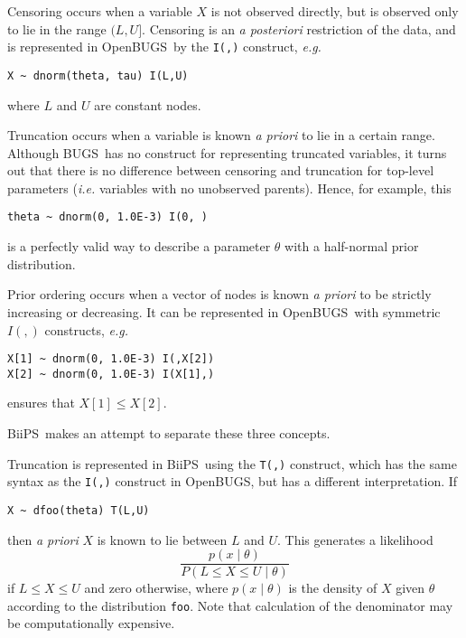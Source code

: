 \documentclass[11pt, a4paper, titlepage]{report}
\newcommand{\biips}{\textsf{BiiPS}}
\newcommand{\BUGS}{\textsf{BUGS}}
\newcommand{\OpenBUGS}{\textsf{OpenBUGS}}
\begin{document}
Censoring occurs when a variable $X$ is not observed directly,
but is observed only to lie in the range $(L,U]$.  Censoring is
an {\em a posteriori} restriction of the data, and is represented
in \OpenBUGS\ by the \texttt{I(,)} construct, {\em e.g.}
\begin{verbatim}
X ~ dnorm(theta, tau) I(L,U)
\end{verbatim}
where $L$ and $U$ are constant nodes.

Truncation occurs when a variable is known {\em a priori} to lie in
a certain range.  Although \BUGS\ has no construct for representing
truncated variables, it turns out that there is no difference between
censoring and truncation for top-level parameters ({\em i.e.} variables
with no unobserved parents).  Hence, for example, this
\begin{verbatim}
theta ~ dnorm(0, 1.0E-3) I(0, )
\end{verbatim}
is a perfectly valid way to describe a parameter $\theta$ with a
half-normal prior distribution.

Prior ordering occurs when a vector of nodes is known {\em a priori}
to be strictly increasing or decreasing. It can be represented in
\OpenBUGS\ with symmetric $I(,)$ constructs,  {\em e.g.}
\begin{verbatim}
X[1] ~ dnorm(0, 1.0E-3) I(,X[2])
X[2] ~ dnorm(0, 1.0E-3) I(X[1],)
\end{verbatim}
ensures that $X[1] \leq X[2]$.

\biips\ makes an attempt to separate these three concepts.


Truncation is represented in \biips\ using the \texttt{T(,)} construct,
which has the same syntax as the \texttt{I(,)} construct in \OpenBUGS,
but has a different interpretation. If
\begin{verbatim}
X ~ dfoo(theta) T(L,U)
\end{verbatim}
then {\em a priori} $X$ is known to lie between $L$ and $U$. This
generates a likelihood
\[
\frac{p(x \mid \theta)}{P(L \leq X \leq U \mid \theta)}
\]
if $L \leq X \leq U$ and zero otherwise, where $p(x \mid \theta)$ is
the density of $X$ given $\theta$ according to the distribution
\texttt{foo}. Note that calculation of the denominator may be
computationally expensive.
\end{document}
